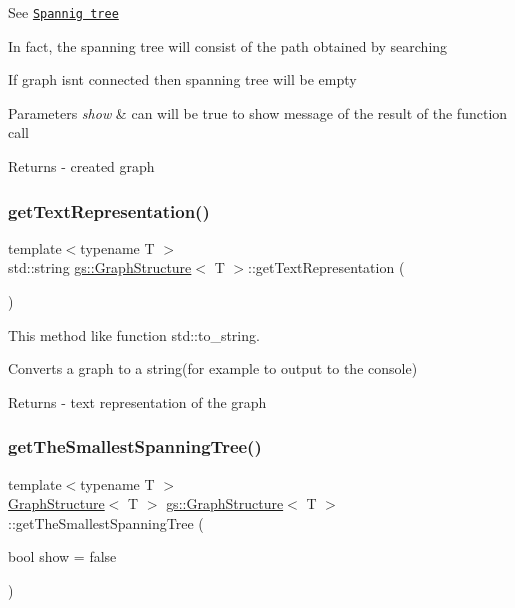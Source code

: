 See \href{https://en.wikipedia.org/wiki/Spanning_tree}{\tt Spannig tree}

In fact, the spanning tree will consist of the path obtained by searching

If graph isn\textquotesingle{}t connected then spanning tree will be empty 
\begin{DoxyParams}{Parameters}
{\em show} & can will be true to show message of the result of the function call \\
\hline
\end{DoxyParams}
\begin{DoxyReturn}{Returns}
-\/ created graph 
\end{DoxyReturn}
\mbox{\label{classgs_1_1_graph_structure_afbecaabb4707e21a0018556100384e8f}} 
\subsubsection{\texorpdfstring{get\+Text\+Representation()}{getTextRepresentation()}}
{\footnotesize\ttfamily template$<$typename T $>$ \\
std\+::string \mbox{\hyperlink{classgs_1_1_graph_structure}{gs\+::\+Graph\+Structure}}$<$ T $>$\+::get\+Text\+Representation (\begin{DoxyParamCaption}{ }\end{DoxyParamCaption})}



This method like function std\+::to\+\_\+string. 

Converts a graph to a string(for example to output to the console) \begin{DoxyReturn}{Returns}
-\/ text representation of the graph 
\end{DoxyReturn}
\mbox{\label{classgs_1_1_graph_structure_a84565337bd8e3ca9a22512b3e7d0e4fb}} 
\subsubsection{\texorpdfstring{get\+The\+Smallest\+Spanning\+Tree()}{getTheSmallestSpanningTree()}}
{\footnotesize\ttfamily template$<$typename T $>$ \\
\mbox{\hyperlink{classgs_1_1_graph_structure}{Graph\+Structure}}$<$ T $>$ \mbox{\hyperlink{classgs_1_1_graph_structure}{gs\+::\+Graph\+Structure}}$<$ T $>$\+::get\+The\+Smallest\+Spanning\+Tree (\begin{DoxyParamCaption}\item[{bool}]{show = {\ttfamily false} }\end{DoxyParamCaption})}



